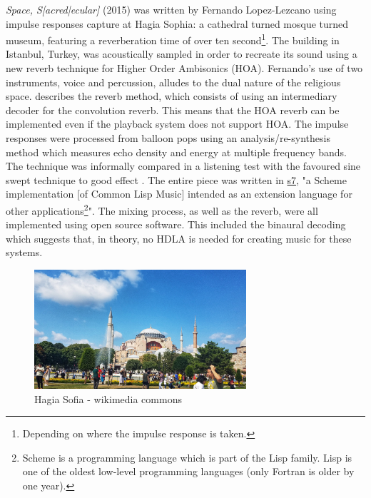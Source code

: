 \textit{Space, S[acred|ecular]} (2015) was written by Fernando Lopez-Lezcano using impulse responses capture at Hagia Sophia: a cathedral turned mosque turned museum, featuring a reverberation time of over ten second\footnote{Depending on where the impulse response is taken.}. The building in Istanbul, Turkey, was acoustically sampled in order to recreate its sound using a new reverb technique for Higher Order Ambisonics (HOA). Fernando's use of two instruments, voice and percussion, alludes to the dual nature of the religious space.  \cite{lopez2014architecture} describes the reverb method, which consists of using an intermediary decoder for the convolution reverb. This means that the HOA reverb can be implemented even if the playback system does not support HOA. The impulse responses were processed from balloon pops using an analysis/re-synthesis method which measures echo density and energy at multiple frequency bands. The technique was informally compared in a listening test with the favoured sine swept technique to good effect \cite{abel2010estimating}. The entire piece was written in \href{https://ccrma.stanford.edu/software/snd/snd/s7.html#juce}{s7}, "a Scheme implementation [of Common Lisp Music] intended as an extension language for other applications\footnote{Scheme is a programming language which is part of the Lisp family. Lisp is one of the oldest low-level programming languages (only Fortran is older by one year).}". The mixing process, as well as the reverb, were all implemented using open source software. This included the binaural decoding which suggests that, in theory, no HDLA is needed for creating music for these systems. 


\begin{figure}[ht!]%
\centering
\includegraphics[width=0.7\textwidth]{img/hagia-sofia.jpg} 
\caption{Hagia Sofia - wikimedia commons}
\end{figure}

